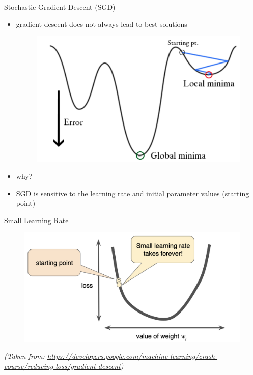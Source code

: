 \begin{frame}{Stochastic Gradient Descent (SGD)}
    \begin{itemize}
        \item<1-> gradient descent does not always lead to best solutions
        \begin{figure}
            \includegraphics[scale=0.3]{./figures/sgd5.png}
        \end{figure}
        \item<2-> why? 
        \item<3-> SGD is sensitive to the learning rate and initial parameter values (starting point)
    \end{itemize}
\end{frame}
\begin{frame}{Small Learning Rate}
         \begin{figure}
        \centering
         \includegraphics[scale=0.4]{./figures/small_lr.png}
        \end{figure}
\vspace*{\fill}
\textit{\tiny{(Taken from: 
\url{https://developers.google.com/machine-learning/crash-course/reducing-loss/gradient-descent})}}     
\end{frame}
